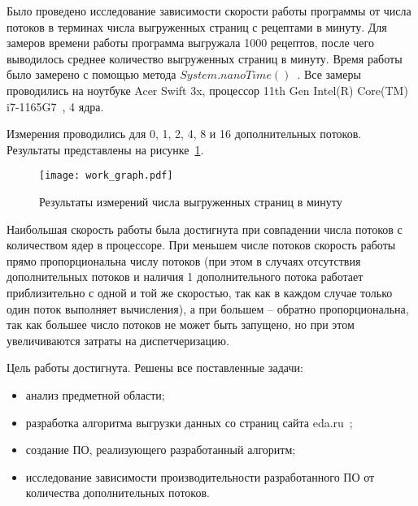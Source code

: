 Было проведено исследование зависимости скорости работы программы от числа потоков в терминах числа выгруженных страниц с рецептами в минуту. Для замеров времени работы программа выгружала 1000 рецептов, после чего выводилось среднее количество выгруженных страниц в минуту. Время работы было замерено с помощью метода $System.nanoTime()$~\cite{nanotime}. Все замеры проводились на ноутбуке Acer Swift 3x, процессор 11th Gen Intel(R) Core(TM) i7-1165G7~\cite{intel}, 4 ядра. 

Измерения проводились для 0, 1, 2, 4, 8 и 16 дополнительных потоков. Результаты представлены на рисунке~\ref{fig:res}.

\clearpage

\begin{figure}[h!]
	\centering
	\texttt{[image: work\_graph.pdf]}
	\caption{\label{fig:res} Результаты измерений числа выгруженных страниц в минуту}
\end{figure}

Наибольшая скорость работы была достигнута при совпадении числа потоков с количеством ядер в процессоре. При меньшем числе потоков скорость работы прямо пропорциональна числу потоков (при этом в случаях отсутствия дополнительных потоков и наличия 1 дополнительного потока работает приблизительно с одной и той же скоростью, так как в каждом случае только один поток выполняет вычисления), а при большем -- обратно пропорциональна, так как большее число потоков не может быть запущено, но при этом увеличиваются затраты на диспетчеризацию.


Цель работы достигнута. Решены все поставленные задачи: 
\begin{itemize}
    \item анализ предметной области;
    \item разработка алгоритма выгрузки данных со страниц сайта eda.ru~\cite{eda};
    \item создание ПО, реализующего разработанный алгоритм;
    \item исследование зависимости производительности разработанного ПО от количества дополнительных потоков.
\end{itemize}

